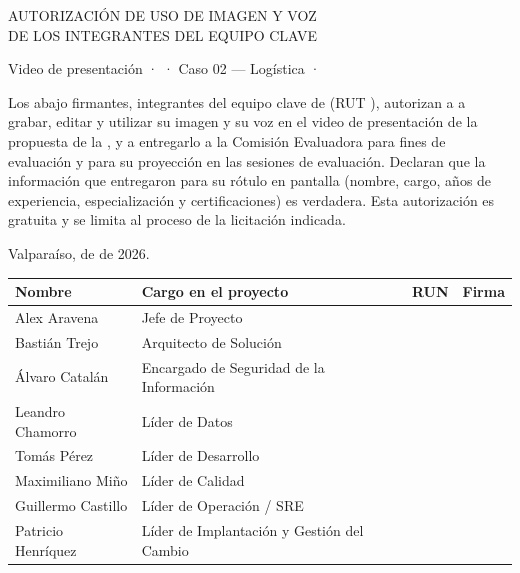 \documentclass[carta,sinfirma,final]{lafrox}
\newcommand{\campo}[1]{\underline{\makebox[#1]{}}}
\newcommand{\filafirma}[2]{%
  #1 & #2 & & \\[18pt]\midrule}
\begin{document}

\begin{center}
  {\intersemibold\fontsize{15pt}{19pt}\selectfont\color{lafroxFuerte}
   AUTORIZACIÓN DE USO DE IMAGEN Y VOZ\\ DE LOS INTEGRANTES DEL EQUIPO CLAVE\par}
  \vspace{6pt}
  {\intermedium\fontsize{10pt}{13pt}\selectfont\color{lafroxGris}
   Video de presentación · \LFXlicitacion{} · Caso 02 — Logística · \LFXcliente\par}
\end{center}

\vspace{10pt}
\noindent Los abajo firmantes, integrantes del equipo clave de \LFXempresa{} (RUT \LFXrut), autorizan a
\LFXempresa{} a grabar, editar y utilizar su imagen y su voz en el video de presentación de la propuesta de la
\LFXlicitacion, y a entregarlo a la Comisión Evaluadora para fines de evaluación y para su proyección en las
sesiones de evaluación. Declaran que la información que entregaron para su rótulo en pantalla (nombre, cargo,
años de experiencia, especialización y certificaciones) es verdadera. Esta autorización es gratuita y se limita
al proceso de la licitación indicada.

\vspace{6pt}
\noindent Valparaíso, \campo{1.2cm} de \campo{3.2cm} de 2026.

\vspace{12pt}
\renewcommand{\arraystretch}{1.25}
\noindent\begin{tabularx}{\textwidth}{@{}p{3.6cm}Xp{2.6cm}p{3.6cm}@{}}
\toprule
\textbf{Nombre} & \textbf{Cargo en el proyecto} & \textbf{RUN} & \textbf{Firma} \\
\midrule
\filafirma{Alex Aravena}{Jefe de Proyecto}
\filafirma{Bastián Trejo}{Arquitecto de Solución}
\filafirma{Álvaro Catalán}{Encargado de Seguridad de la Información}
\filafirma{Leandro Chamorro}{Líder de Datos}
\filafirma{Tomás Pérez}{Líder de Desarrollo}
\filafirma{Maximiliano Miño}{Líder de Calidad}
\filafirma{Guillermo Castillo}{Líder de Operación / SRE}
\filafirma{Patricio Henríquez}{Líder de Implantación y Gestión del Cambio}
\end{tabularx}
\end{document}
